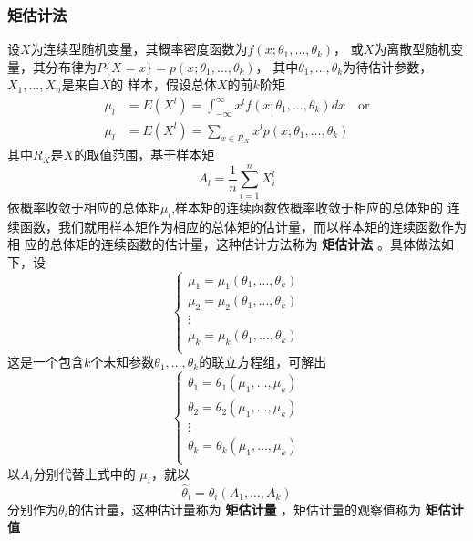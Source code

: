 \documentclass[11pt]{article}
\begin{document}
\subsubsection{矩估计法}
\label{sec:orgb1f0ba3}
设\(X\)为连续型随机变量，其概率密度函数为\(f(x;\theta_1,\dots,\theta_k)\)，
或\(X\)为离散型随机变量，其分布律为\(P\{X=x\}=p(x;\theta_1,\dots,\theta_k)\)，
其中\(\theta_1,\dots,\theta_k\)为待估计参数，\(X_1,\dots,X_n\)是来自\(X\)的
样本，假设总体\(X\)的前\(k\)阶矩
\begin{align*}
 \mu_l&=E(X^l)=\int_{-\infty}^\infty x^lf(x;\theta_1,\dots,\theta_k)dx \quad\text{or}\\
 \mu_l&=E(X^l)=\sum_{x\in R_X}x^lp(x;\theta_1,\dots,\theta_k)
\end{align*}
其中\(R_X\)是\(X\)的取值范围，基于样本矩
\begin{equation*}
A_l=\frac{1}{n}\sum_{i=1}^nX_i^l
\end{equation*}
依概率收敛于相应的总体矩\(\mu_l\),样本矩的连续函数依概率收敛于相应的总体矩的
连续函数，我们就用样本矩作为相应的总体矩的估计量，而以样本矩的连续函数作为相
应的总体矩的连续函数的估计量，这种估计方法称为 \textbf{矩估计法} 。具体做法如下，设
\begin{equation*}
\begin{cases}
\mu_1=\mu_1(\theta_1,\dots,\theta_k)\\
\mu_2=\mu_2(\theta_1,\dots,\theta_k)\\
\vdots\\
\mu_k=\mu_k(\theta_1,\dots,\theta_k)\\
\end{cases}
\end{equation*}
这是一个包含\(k\)个未知参数\(\theta_1,\dots,\theta_k\)的联立方程组，可解出
\begin{equation*}
\begin{cases}
\theta_1=\theta_1(\mu_1,\dots,\mu_k)\\
\theta_2=\theta_2(\mu_1,\dots,\mu_k)\\
\vdots\\
\theta_k=\theta_k(\mu_1,\dots,\mu_k)\\
\end{cases}
\end{equation*}
以\(A_i\)分别代替上式中的 \(\mu_i\)，就以
\begin{equation*}
\hat{\theta}_i=\theta_i(A_1,\dots,A_k)
\end{equation*}
分别作为\(\theta_i\)的估计量，这种估计量称为 \textbf{矩估计量} ，矩估计量的观察值称为
\textbf{矩估计值}
\end{document}
